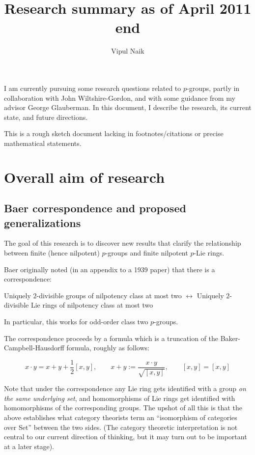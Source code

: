 \documentclass[10pt]{amsart}
\title{Research summary as of April 2011 end}
\author{Vipul Naik}
\begin{document}
\maketitle

I am currently pursuing some research questions related to $p$-groups,
partly in collaboration with John Wiltshire-Gordon, and with some
guidance from my advisor George Glauberman. In this document, I
describe the research, its current state, and future directions.

This is a rough sketch document lacking in footnotes/citations or
precise mathematical statements.

\section*{Overall aim of research}

\subsection*{Baer correspondence and proposed generalizations}

The goal of this research is to discover new results that clarify the
relationship between finite (hence nilpotent) $p$-groups and finite
nilpotent $p$-Lie rings.

Baer originally noted (in an appendix to a 1939 paper) that there is a
correspondence:

Uniquely $2$-divisible groups of nilpotency class at most two
$\leftrightarrow$ Uniquely $2$-divisible Lie rings of nilpotency class
at most two

In particular, this works for odd-order class two $p$-groups.

The correspondence proceeds by a formula which is a truncation of the
Baker-Campbell-Hausdorff formula, roughly as follows:

$$x \cdot y = x + y + \frac{1}{2}[x,y], \qquad x + y :=  \frac{x \cdot y}{\sqrt{[x,y]}}, \qquad [x,y] = [x,y]$$

Note that under the correspondence any Lie ring gets identified with a
group {\em on the same underlying set}, and homomorphisms of Lie rings
get identified with homomorphisms of the corresponding groups. The
upshot of all this is that the above establishes what category
theorists term an ``isomorphism of categories over Set'' between the
two sides. (The category theoretic interpretation is not central to
our current direction of thinking, but it may turn out to be important
at a later stage).
\end{document}

